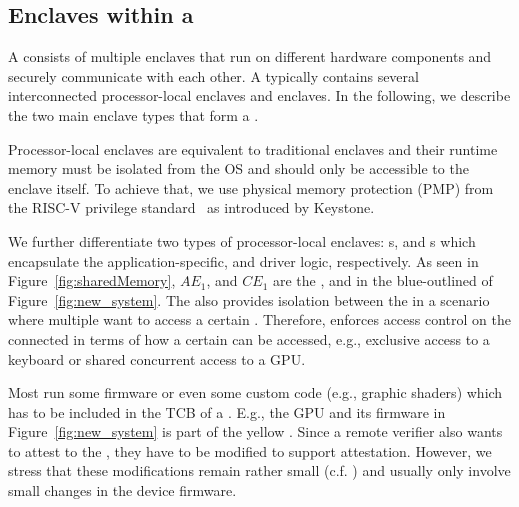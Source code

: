 \subsection{Enclaves within a \nameenclave}
\label{sec:overview:enclaves}

A \nameenclave{} consists of multiple enclaves that run on different hardware components and securely communicate with each other. A \nameenclave{} typically contains several interconnected processor-local enclaves and \sphw enclaves. In the following, we describe the two main enclave types that form a \nameenclave{}.

\label{sec:overview:enclaves:processorEnclave}

Processor-local enclaves are equivalent to traditional enclaves and their runtime memory must be isolated from the OS and should only be accessible to the enclave itself. To achieve that, we use physical memory protection (PMP) from the RISC-V privilege standard~\cite{riscv2019privspec} as introduced by Keystone.

We further differentiate two types of processor-local enclaves: \app{}s, and \ce{}s which encapsulate the application-specific, and driver logic, respectively. As seen in Figure~\ref{fig:sharedMemory}, $AE_1$, and $CE_1$ are the \app, and \ce in the blue-outlined \nameenclave of Figure~\ref{fig:new_system}. The \ce also provides isolation between the \apps in a scenario where multiple \apps want to access a certain \sphw. Therefore, \ce enforces access control on the connected \apps in terms of how a certain \sphw can be accessed, e.g., exclusive access to a keyboard or shared concurrent access to a GPU. 

\label{sec:overview:enclaves:peripheralEnclave}
Most \sphw run some firmware or even some custom code (e.g., graphic shaders) which has to be included in the TCB of a \nameenclave.
E.g., the GPU and its firmware in Figure~\ref{fig:new_system} is part of the yellow \nameenclave. Since a remote verifier also wants to attest to the \sphw, they have to be modified to support attestation. However, we stress that these modifications  remain rather small (c.f. ) and usually only involve small changes in the device firmware. %

